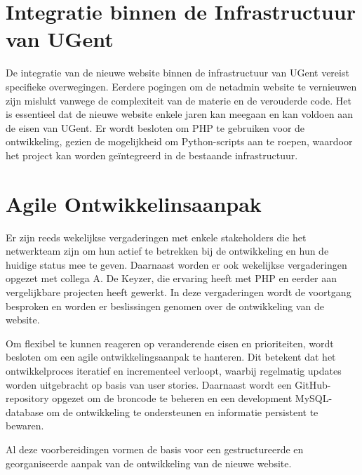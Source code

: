 \section{Integratie binnen de Infrastructuur van UGent}
De integratie van de nieuwe website binnen de infrastructuur van UGent vereist specifieke overwegingen. Eerdere pogingen om de netadmin website te vernieuwen zijn mislukt vanwege de complexiteit van de materie en de verouderde code. Het is essentieel dat de nieuwe website enkele jaren kan meegaan en kan voldoen aan de eisen van UGent. Er wordt besloten om PHP te gebruiken voor de ontwikkeling, gezien de mogelijkheid om Python-scripts aan te roepen, waardoor het project kan worden geïntegreerd in de bestaande infrastructuur.

\section{Agile Ontwikkelinsaanpak}
Er zijn reeds wekelijkse vergaderingen met enkele stakeholders die het netwerkteam zijn om hun actief te betrekken bij de ontwikkeling en hun de huidige status mee te geven. Daarnaast worden er ook wekelijkse vergaderingen opgezet met collega A. De Keyzer, die ervaring heeft met PHP en eerder aan vergelijkbare projecten heeft gewerkt. In deze vergaderingen wordt de voortgang besproken en worden er  beslissingen genomen over de ontwikkeling van de website.

Om flexibel te kunnen reageren op veranderende eisen en prioriteiten, wordt besloten om een agile ontwikkelingsaanpak te hanteren. Dit betekent dat het ontwikkelproces iteratief en incrementeel verloopt, waarbij regelmatig updates worden uitgebracht op basis van user stories. Daarnaast wordt een GitHub-repository opgezet om de broncode te beheren en een development MySQL-database om de ontwikkeling te ondersteunen en informatie persistent te bewaren.

Al deze voorbereidingen vormen de basis voor een gestructureerde en georganiseerde aanpak van de ontwikkeling van de nieuwe website.
